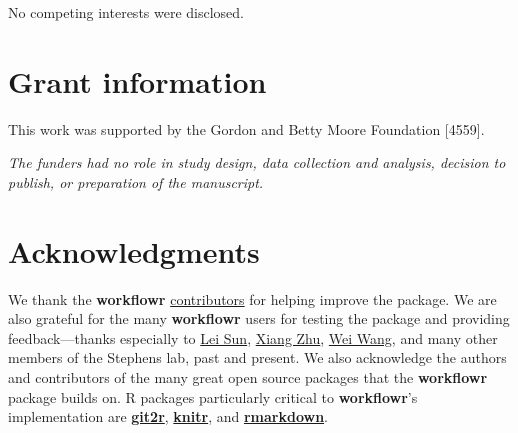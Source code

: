 \documentclass[9pt,a4paper]{extarticle}
\begin{document}
No competing interests were disclosed.


\section*{Grant information}

This work was supported by the Gordon and Betty Moore Foundation [4559].

\textit{The funders had no role in study design, data collection and
analysis, decision to publish, or preparation of the manuscript.}


\section*{Acknowledgments}

We thank the \textbf{workflowr}
\href{https://github.com/jdblischak/workflowr/graphs/contributors}{contributors}
for helping improve the package. We are also grateful for the many
 \textbf{workflowr} users for testing the package and providing feedback---thanks
especially to \href{https://github.com/LSun}{Lei Sun},
\href{https://github.com/xiangzhu}{Xiang Zhu},
\href{https://github.com/NKweiwang}{Wei Wang}, and many other members of
the Stephens lab, past and present. We also acknowledge the authors and
contributors of the many great open source packages that the \textbf{workflowr}
package builds on. R packages particularly critical to \textbf{workflowr}'s
implementation are
\textbf{\href{https://github.com/ropensci/git2r}{git2r}},
\textbf{\href{https://github.com/yihui/knitr}{knitr}}, and
\textbf{\href{http://rmarkdown.rstudio.com/}{rmarkdown}}.

{\small

}
\end{document}
